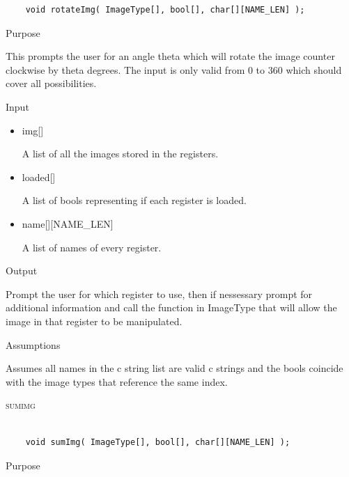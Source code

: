 \documentclass[pdftex, 11pt]{article}
\begin{document}
\begin{description}
\begin{lstlisting}
	void rotateImg( ImageType[], bool[], char[][NAME_LEN] );
		\end{lstlisting}

		\begin{description}
			\item{Purpose}

				This prompts the user for an angle theta which will rotate the image counter 
				clockwise by theta degrees.  The input is only valid from 0 to 360 which
				should cover all possibilities.

			\item{Input}

				\begin{itemize}

					\item{img[]}

						A list of all the images stored in the registers.

					\item{loaded[]}

						A list of bools representing if each register is loaded.

					\item{name[][NAME\_LEN]}

						A list of names of every register.

				\end{itemize}

			\item{Output}

				Prompt the user for which register to use, then if nessessary
				prompt for additional information and call the function
				in ImageType that will allow the image in that register to
				be manipulated.

			\item{Assumptions}

				Assumes all names in the c string list are valid c
				strings and the bools coincide with the image types that
				reference the same index.

		\end{description}



	\item{\textsc{sumimg}}

		\begin{lstlisting}

	void sumImg( ImageType[], bool[], char[][NAME_LEN] );
		\end{lstlisting}

		\begin{description}
			\item{Purpose}


\end{description}
\end{description}
\end{document}
